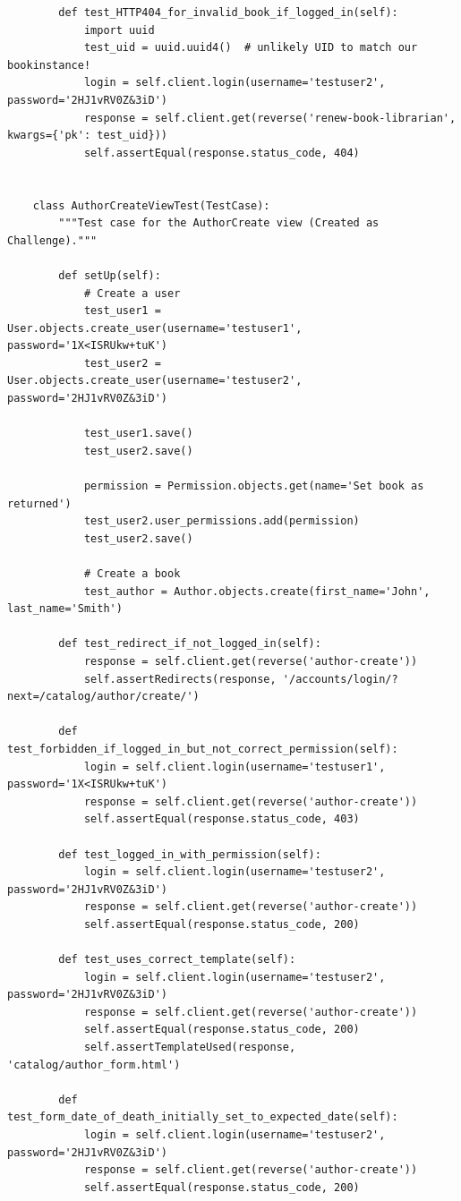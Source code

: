 \documentclass[12pt, a4paper]{report}
\begin{document}
\begin{lstlisting}
		def test_HTTP404_for_invalid_book_if_logged_in(self):
			import uuid
			test_uid = uuid.uuid4()  # unlikely UID to match our bookinstance!
			login = self.client.login(username='testuser2', password='2HJ1vRV0Z&3iD')
			response = self.client.get(reverse('renew-book-librarian', kwargs={'pk': test_uid}))
			self.assertEqual(response.status_code, 404)
	
	
	class AuthorCreateViewTest(TestCase):
		"""Test case for the AuthorCreate view (Created as Challenge)."""
	
		def setUp(self):
			# Create a user
			test_user1 = User.objects.create_user(username='testuser1', password='1X<ISRUkw+tuK')
			test_user2 = User.objects.create_user(username='testuser2', password='2HJ1vRV0Z&3iD')
	
			test_user1.save()
			test_user2.save()
	
			permission = Permission.objects.get(name='Set book as returned')
			test_user2.user_permissions.add(permission)
			test_user2.save()
	
			# Create a book
			test_author = Author.objects.create(first_name='John', last_name='Smith')
	
		def test_redirect_if_not_logged_in(self):
			response = self.client.get(reverse('author-create'))
			self.assertRedirects(response, '/accounts/login/?next=/catalog/author/create/')
	
		def test_forbidden_if_logged_in_but_not_correct_permission(self):
			login = self.client.login(username='testuser1', password='1X<ISRUkw+tuK')
			response = self.client.get(reverse('author-create'))
			self.assertEqual(response.status_code, 403)
	
		def test_logged_in_with_permission(self):
			login = self.client.login(username='testuser2', password='2HJ1vRV0Z&3iD')
			response = self.client.get(reverse('author-create'))
			self.assertEqual(response.status_code, 200)
	
		def test_uses_correct_template(self):
			login = self.client.login(username='testuser2', password='2HJ1vRV0Z&3iD')
			response = self.client.get(reverse('author-create'))
			self.assertEqual(response.status_code, 200)
			self.assertTemplateUsed(response, 'catalog/author_form.html')
	
		def test_form_date_of_death_initially_set_to_expected_date(self):
			login = self.client.login(username='testuser2', password='2HJ1vRV0Z&3iD')
			response = self.client.get(reverse('author-create'))
			self.assertEqual(response.status_code, 200)
	

\end{lstlisting}
\end{document}
